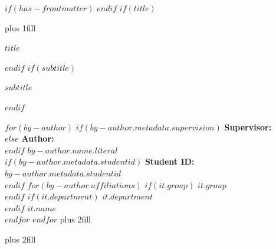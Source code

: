 $if(has-frontmatter)$
\frontmatter
$endif$
$if(title)$
\cleardoublepage
\thispagestyle{empty}
{\centering
\hbox{}\vskip 0cm plus 1fill

{%
\Huge\bfseries $title$ \par}
$endif$
$if(subtitle)$
\vspace{3ex}
{\Large\bfseries $subtitle$ \par}
$endif$
\vspace{5ex}

$for(by-author)$
    $if(by-author.metadata.supervision)$
    {\bfseries Supervisor: \\ \vspace{0.5ex}}
    $else$
    {\bfseries Author: \\ \vspace{0.5ex}}
    $endif$
    {\Large\bfseries $by-author.name.literal$ \\ \vspace{0.7ex}}
    $if(by-author.metadata.studentid)$
        {\large\bfseries Student ID: $by-author.metadata.studentid$ \\ \vspace{0.7ex} }
    $endif$
    $for(by-author.affiliations)$%
        $if(it.group)$%
        {\bfseries\large $it.group$ \\ \vspace{0.7ex}}
        $endif$%
        $if(it.department)$%
        {\bfseries\large $it.department$ \\ \vspace{0.7ex}}
        $endif$%
        {\bfseries\large $it.name$ \\ \vspace{2ex}}
    $endfor$%
$endfor$%
\vskip 0cm plus 2fill

{ \par}
\vskip 0cm plus 2fill

}
